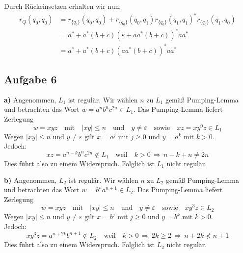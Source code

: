 \documentclass[a4paper,graphics,11pt]{article}
\newcommand{\aufgabe}[1]{\subsection*{Aufgabe #1}}
\begin{document}
Durch Rückeinsetzen erhalten wir nun:
\begin{align*}
    r_Q(q_0, q_0) &=
    r_{\{q_0\}}(q_0, q_0)
    + r_{\{q_0\}}(q_0, q_1)r_{\{q_0\}}(q_1, q_1)^*r_{\{q_0\}}(q_1, q_0)\\
    &= a^* + a^*(b+c)(\varepsilon + aa^*(b+c))^*aa^*\\
    &= a^* + a^*(b+c)(aa^*(b+c))^*aa^*
\end{align*}
\newpage
\aufgabe{6}
\textbf{a)}
Angenommen, $L_1$ ist regulär. Wir wählen $n$ zu $L_1$ gemäß Pumping-Lemma und betrachten
das Wort $w = a^nb^nc^{2n} \in L_1$. Das Pumping-Lemma liefert Zerlegung
$$
    w = xyz
    \quad \text{mit}\quad
    |xy| \leq n
    \quad \text{und}\quad
    y\neq \varepsilon
    \quad \text{sowie}\quad
    xz = xy^0z \in L_1
$$
Wegen $|xy| \leq n$ und $y\neq \varepsilon$ gilt $x = a^j$ mit $j \geq 0$ und $y = a^k$ mit $k > 0$.\\[3pt]
Jedoch:
$$
    xz = a^{n-k}b^nc^{2n} \notin L_1
    \quad\text{weil}\quad
    k > 0 \,\Longrightarrow\, n-k + n \neq 2n
$$
Dies führt also zu einem Widerspruch. Folglich ist $L_1$ nicht regulär.

\textbf{b)}
Angenommen, $L_2$ ist regulär. Wir wählen $n$ zu $L_2$ gemäß Pumping-Lemma und betrachten
das Wort $w = b^na^{n+1} \in L_2$. Das Pumping-Lemma liefert Zerlegung
$$
    w = xyz
    \quad \text{mit}\quad
    |xy| \leq n
    \quad \text{und}\quad
    y\neq \varepsilon
    \quad \text{sowie}\quad
    xy^3z \in L_2
$$
Wegen $|xy| \leq n$ und $y \neq \varepsilon$ gilt $x = b^j$ mit $j \geq 0$ und $y = b^k$ mit $k > 0$.\\[3pt]
Jedoch:
$$
    xy^3z = a^{n+2k}b^{n+1} \notin L_2
    \quad\text{weil}\quad
    k > 0 \,\Longrightarrow\, 2k \geq 2 \,\Longrightarrow\, n+2k \not< n+1
$$
Dies führt also zu einem Widerspruch. Folglich ist $L_2$ nicht regulär.
\end{document}
